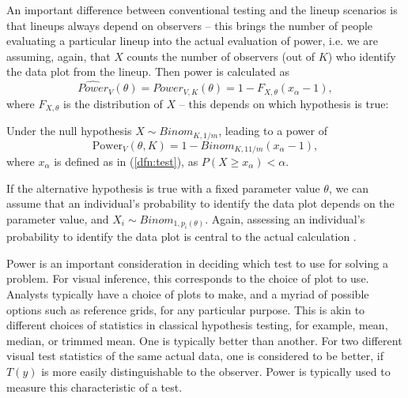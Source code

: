 \documentclass{article}
\newcommand{\red}[1]{{\color{red} #1}}
\newcommand{\hh}[1]{{\color{orange} #1}} %
\begin{document}
\hh{\noindent An important difference between conventional testing and the lineup scenarios is that lineups always depend on observers -- this brings the number of people evaluating a particular lineup into the actual evaluation of power, i.e. we are assuming, again, that $X$ counts the number of observers (out of $K$) who identify the data plot from the lineup.
Then power is calculated as
\[
\widehat{Power}_{V} (\theta) = {Power}_{V, K} (\theta) = 1 - F_{X, \theta} (x_{\alpha} - 1),
\] 
where $F_{X, \theta}$ is the distribution of $X$ -- this depends on which hypothesis is true:

Under the null hypothesis $X \sim Binom_{K, 1/m}$, leading to a power of 
\[
\text{Power}_V(\theta, K)= 1 - Binom_{K, 11/m} (x_\alpha - 1),
\]
where $x_\alpha$ is defined as in (\ref{dfn:test}), as  $P(X \ge x_{\alpha}) < \alpha$.

If the alternative hypothesis is true with a fixed parameter value $\theta$, we can assume that an individual's probability to identify the data plot depends on the parameter value, and $X_i \sim Binom_{1, p_i(\theta)}$. Again, assessing an individual's probability to identify the data plot  is central to the actual calculation .
}


Power is an important consideration in deciding which test to use for solving a problem. %
For visual inference, this corresponds to the choice of plot to use. Analysts typically have a choice of plots to make, and a myriad of possible options such as reference grids, for any particular purpose. This is akin to different choices of statistics in classical hypothesis testing, for example, mean, median, or trimmed mean. One is typically better than another. For two different visual test statistics of the same actual data, one is considered to be better, if $T(y)$ is more easily distinguishable to the observer. Power is typically used to measure this characteristic of a test. %
\end{document}
